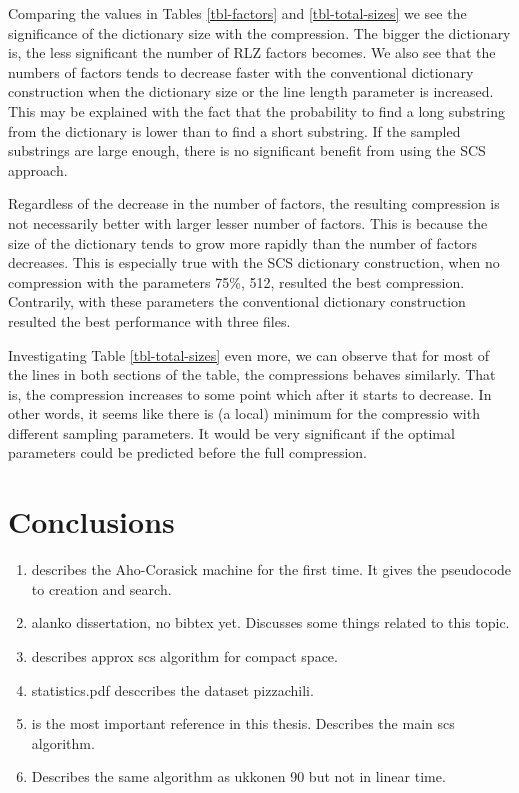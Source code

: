 \documentclass[english,twoside,censored,csm,algorithms-track-2020]{HYthesisML}
\theoremstyle{plain}
\theoremstyle{definition}
\begin{document}
Comparing the values in Tables \ref{tbl-factors} and \ref{tbl-total-sizes} we see the significance
of the dictionary size with the compression. The bigger the dictionary is, the less significant the
number of RLZ factors becomes. We also see that the numbers of factors tends to decrease faster
with the conventional dictionary construction when the dictionary size or the line length parameter
is increased. This may be explained with the fact that the probability to find a long substring from
the dictionary is lower than to find a short substring. If the sampled substrings are large enough,
there is no significant benefit from using the SCS approach.

Regardless of the decrease in the number of factors, the resulting compression is not necessarily
better with larger lesser number of factors. This is because the size of the dictionary tends to grow more
rapidly than the number of factors decreases. This is especially true with the SCS dictionary
construction, when no compression with the parameters 75\%, 512, resulted the best compression.
Contrarily, with these parameters the conventional dictionary construction resulted the best
performance with three files.

Investigating Table \ref{tbl-total-sizes} even more, we can observe that for most of the lines
in both sections of the table, the compressions behaves similarly. That is, the compression
increases to some point which after it starts to decrease. In other words, it seems like
there is (a local) minimum for the compressio with different sampling parameters.
It would be very significant if the optimal parameters could be predicted before the full compression.


\chapter{Conclusions}
  

  \begin{enumerate}
  \item \citep{Aho75} describes the Aho-Corasick machine for the first time. It gives the pseudocode to creation and search.
  \item alanko dissertation, no bibtex yet. Discusses some things related to this topic.
  \item \citep{Alanko17} describes approx scs algorithm for compact space.
  \item statistics.pdf desccribes the dataset pizzachili.
  \item \citep{Ukkonen90} is the most important reference in this thesis. Describes the main scs algorithm.
  \item \citep{Tarhio88} Describes the same algorithm as ukkonen 90 but not in linear time.
  \end{enumerate}
\end{document}
